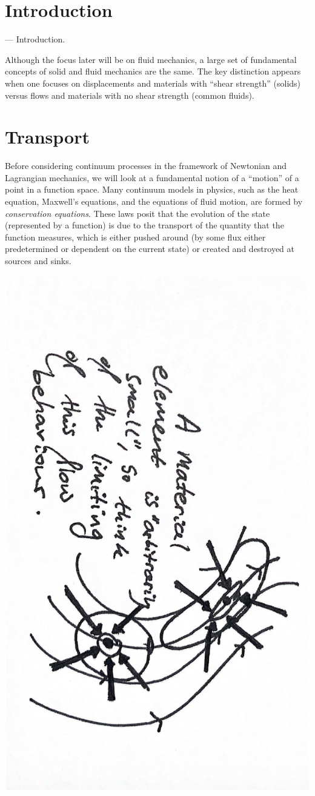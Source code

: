 
\section{Introduction}
--- Introduction.

Although the focus later will be on fluid mechanics, a large set of fundamental concepts of solid and fluid mechanics
are the same. The key distinction appears when one focuses on displacements and materials with ``shear strength'' (solids)  versus flows
and materials with no shear strength (common fluids).


\section{Transport}
Before considering continuum processes in the framework of Newtonian and Lagrangian mechanics, we will look at a fundamental notion of a ``motion''
of a point in a function space. Many continuum models in physics, such as the heat equation,
Maxwell's equations, and the equations of fluid motion, are formed by \textit{conservation equations}. These laws posit that the
evolution of the state (represented by a function) is
due to the transport of the quantity that the function measures, which is either pushed around (by some flux either predetermined or dependent on the current state)
or created and destroyed at sources and sinks.

\begin{center}
\includegraphics[angle=90,page=11,width=0.56\linewidth]{figures/2.pdf}
\end{center}

